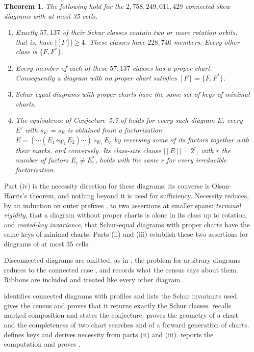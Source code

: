 \documentclass[11pt,a4paper]{amsart}
\numberwithin{equation}{section}
\theoremstyle{plain}
\newtheorem{theorem}{Theorem}[section]
\theoremstyle{definition}
\begin{document}
\begin{theorem}\label{thm:main}
The following hold for the \(2{,}758{,}249{,}011{,}429\) connected skew diagrams with at most 35 cells.
\begin{enumerate}
\item[(i)] Exactly \(57{,}137\) of their Schur classes contain two or more rotation orbits, that is, have \(|[F]|\ge4\).  These classes have \(228{,}740\) members.  Every other class is \(\{F,F^*\}\).
\item[(ii)] Every member of each of these \(57{,}137\) classes has a proper chart.  Consequently a diagram with no proper chart satisfies \([F]=\{F,F^*\}\).
\item[(iii)] Schur-equal diagrams with proper charts have the same set of keys of minimal charts.
\item[(iv)] The equivalence of Conjecture~5.7 of \cite{McNamara2009Classification} holds for every such diagram \(E\): every \(E'\) with \(s_{E'}=s_E\) is obtained from a factorization \(E=(\cdots(E_1\circ_{W_2}E_2)\cdots)\circ_{W_r}E_r\) by reversing some of its factors together with their marks, and conversely.  Its class-size clause \(|[E]|=2^r\), with \(r\) the number of factors \(E_i\ne E_i^*\), holds with the same \(r\) for every irreducible factorization.
\end{enumerate}
\end{theorem}

Part (iv) is the necessity direction for these diagrams; its converse is Olson-Harris's theorem, and nothing beyond it is used for sufficiency.  Necessity reduces, by an induction on outer prefixes \cite{Shields2026Gluing}, to two assertions at smaller spans: \emph{terminal rigidity}, that a diagram without proper charts is alone in its class up to rotation, and \emph{rooted-key invariance}, that Schur-equal diagrams with proper charts have the same keys of minimal charts.  Parts (ii) and (iii) establish these two assertions for diagrams of at most 35 cells.

Disconnected diagrams are omitted, as in \cite{McNamara2009Classification}: the problem for arbitrary diagrams reduces to the connected case \cite[Prop.~3.2]{McNamara2009Classification}, and  records what the census says about them.  Ribbons are included and treated like every other diagram.

 identifies connected diagrams with profiles and lists the Schur invariants used.   gives the census and proves that it returns exactly the Schur classes.   recalls marked composition and states the conjecture.   proves the geometry of a chart and the completeness of two chart searches and of a forward generation of charts.   defines keys and derives necessity from parts (ii) and (iii).   reports the computation and proves .
\end{document}
